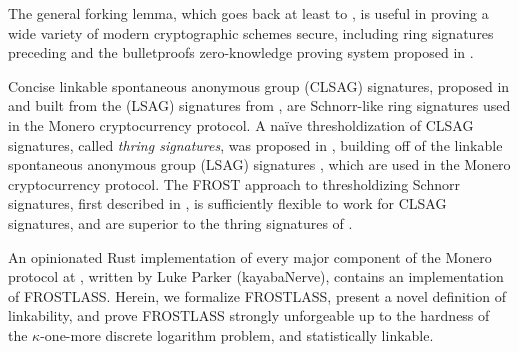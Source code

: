\documentclass[11pt]{article}
\theoremstyle{definition}
\newcommand{\bran}[1]{{\textcolor{Rhodamine}{#1}}}
\begin{document}
The general forking lemma, which goes back at least to \cite{li1988analysis}, is useful in proving a wide variety of modern cryptographic schemes secure, including ring signatures preceding \cite{zhang2002id} and the bulletproofs zero-knowledge proving system proposed in \cite{bunz2018bulletproofs}. 

Concise linkable spontaneous anonymous group (CLSAG) signatures, proposed in \cite{clsag} and built from the (LSAG) signatures from \cite{liu2004linkable}, are Schnorr-like ring signatures used in the Monero cryptocurrency protocol.
A na\"{i}ve thresholdization of CLSAG signatures, called \textit{thring signatures}, was proposed in \cite{goodell2018thring}, building off of the linkable spontaneous anonymous group (LSAG) signatures , which are used in the Monero cryptocurrency protocol. The FROST approach to thresholdizing Schnorr signatures, first described in \cite{komlo2021frost}, is sufficiently flexible to work for CLSAG signatures, and are superior to the thring signatures of \cite{goodell2018thring}.


An opinionated Rust implementation of every major component of the Monero protocol at \cite{SeraiRepo}, written by Luke Parker (kayabaNerve), contains an implementation of FROSTLASS. Herein, we formalize FROSTLASS, present a novel definition of linkability, and prove FROSTLASS strongly unforgeable up to the hardness of the $\kappa$-one-more discrete logarithm problem, and statistically linkable.


\end{document}
